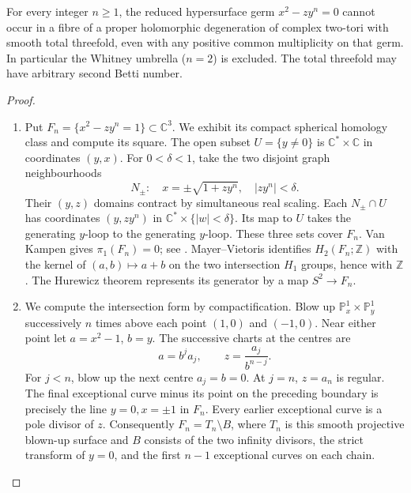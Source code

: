 \begin{proposition}\hypertarget{tag-02WN}{}\label{night:P4.16}\label{stmt:P4.16}

For every integer $n\geq1$, the reduced hypersurface germ
$x^2-zy^n=0$ cannot occur in a fibre of a proper holomorphic
degeneration of complex two-tori with smooth total threefold,
even with any positive common multiplicity on that germ.
In particular the Whitney umbrella ($n=2$) is excluded.
The total threefold may have arbitrary second Betti number.
\end{proposition}
\begin{proof}

\begin{enumerate}[label={$\langle1\rangle$\arabic*.},leftmargin=*]
\item Put $F_n=\{x^2-zy^n=1\}\subset\mathbb C^3$. We exhibit its
compact spherical homology class and compute its square.
The open subset $U=\{y\ne0\}$ is
$\mathbb C^*\times\mathbb C$ in coordinates $(y,x)$.
For $0<\delta<1$, take the two disjoint graph neighbourhoods
\[
 N_\pm:\quad x=\pm\sqrt{1+zy^n},\quad |zy^n|<\delta.
\]
Their $(y,z)$ domains contract by simultaneous real scaling.
Each $N_\pm\cap U$ has coordinates $(y,zy^n)$ in
$\mathbb C^*\times\{|w|<\delta\}$. Its map to $U$ takes
the generating $y$-loop to the generating $y$-loop. These three
sets cover $F_n$. Van Kampen gives $\pi_1(F_n)=0$; see \cite[Theorem~1.20, p.~43]{Hatcher2002}.
Mayer--Vietoris \cite[\S2.2, pp.~149--150]{Hatcher2002} identifies $H_2(F_n;\mathbb Z)$ with the
kernel of $(a,b)\mapsto a+b$ on the two intersection
$H_1$ groups, hence with $\mathbb Z$. The Hurewicz theorem
\cite[Theorem~4.32, pp.~366--367]{Hatcher2002} represents its
generator by a map $S^2\to F_n$.

\item We compute the intersection form by compactification. Blow up
$\mathbb P^1_x\times\mathbb P^1_y$ successively $n$ times above
each point $(1,0)$ and $(-1,0)$. Near either point let
$a=x^2-1$, $b=y$. The successive charts at the centres are
\[
 a=b^j a_j,\qquad z=\frac{a_j}{b^{n-j}}.
\]
For $j<n$, blow up the next centre $a_j=b=0$.
At $j=n$, $z=a_n$ is regular. The final exceptional curve
minus its point on the preceding boundary is precisely the
line $y=0,x=\pm1$ in $F_n$. Every earlier exceptional curve
is a pole divisor of $z$. Consequently $F_n=T_n\setminus B$,
where $T_n$ is this smooth projective blown-up surface and
$B$ consists of the two infinity divisors, the strict transform
of $y=0$, and the first $n-1$ exceptional curves on each chain.


\end{enumerate}
\end{proof}
